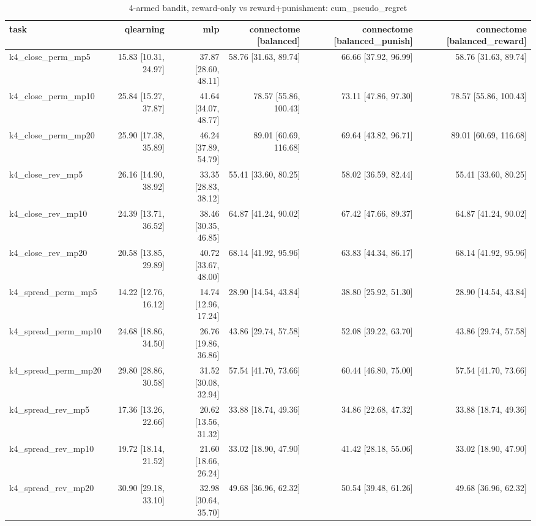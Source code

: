 \begin{table}[t]
\centering
\small
\begin{tabular}{lrrrrr}
\toprule
task & qlearning & mlp & connectome [balanced] & connectome [balanced\_punish] & connectome [balanced\_reward] \\
\midrule
k4\_close\_perm\_mp5 & 15.83 [10.31, 24.97] & 37.87 [28.60, 48.11] & 58.76 [31.63, 89.74] & 66.66 [37.92, 96.99] & 58.76 [31.63, 89.74] \\
k4\_close\_perm\_mp10 & 25.84 [15.27, 37.87] & 41.64 [34.07, 48.77] & 78.57 [55.86, 100.43] & 73.11 [47.86, 97.30] & 78.57 [55.86, 100.43] \\
k4\_close\_perm\_mp20 & 25.90 [17.38, 35.89] & 46.24 [37.89, 54.79] & 89.01 [60.69, 116.68] & 69.64 [43.82, 96.71] & 89.01 [60.69, 116.68] \\
k4\_close\_rev\_mp5 & 26.16 [14.90, 38.92] & 33.35 [28.83, 38.12] & 55.41 [33.60, 80.25] & 58.02 [36.59, 82.44] & 55.41 [33.60, 80.25] \\
k4\_close\_rev\_mp10 & 24.39 [13.71, 36.52] & 38.46 [30.35, 46.85] & 64.87 [41.24, 90.02] & 67.42 [47.66, 89.37] & 64.87 [41.24, 90.02] \\
k4\_close\_rev\_mp20 & 20.58 [13.85, 29.89] & 40.72 [33.67, 48.00] & 68.14 [41.92, 95.96] & 63.83 [44.34, 86.17] & 68.14 [41.92, 95.96] \\
k4\_spread\_perm\_mp5 & 14.22 [12.76, 16.12] & 14.74 [12.96, 17.24] & 28.90 [14.54, 43.84] & 38.80 [25.92, 51.30] & 28.90 [14.54, 43.84] \\
k4\_spread\_perm\_mp10 & 24.68 [18.86, 34.50] & 26.76 [19.86, 36.86] & 43.86 [29.74, 57.58] & 52.08 [39.22, 63.70] & 43.86 [29.74, 57.58] \\
k4\_spread\_perm\_mp20 & 29.80 [28.86, 30.58] & 31.52 [30.08, 32.94] & 57.54 [41.70, 73.66] & 60.44 [46.80, 75.00] & 57.54 [41.70, 73.66] \\
k4\_spread\_rev\_mp5 & 17.36 [13.26, 22.66] & 20.62 [13.56, 31.32] & 33.88 [18.74, 49.36] & 34.86 [22.68, 47.32] & 33.88 [18.74, 49.36] \\
k4\_spread\_rev\_mp10 & 19.72 [18.14, 21.52] & 21.60 [18.66, 26.24] & 33.02 [18.90, 47.90] & 41.42 [28.18, 55.06] & 33.02 [18.90, 47.90] \\
k4\_spread\_rev\_mp20 & 30.90 [29.18, 33.10] & 32.98 [30.64, 35.70] & 49.68 [36.96, 62.32] & 50.54 [39.48, 61.26] & 49.68 [36.96, 62.32] \\
\bottomrule
\end{tabular}
\caption{4-armed bandit, reward-only vs reward+punishment: cum\_pseudo\_regret}
\label{tab:bandit_punish_cum_pseudo_regret}
\end{table}